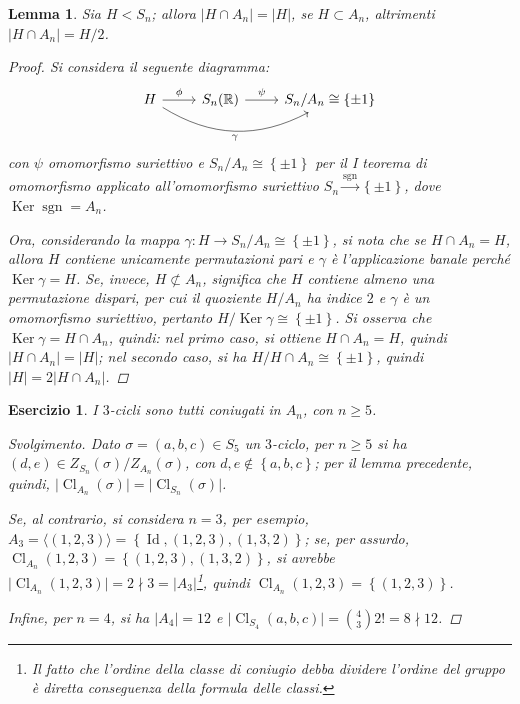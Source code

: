 \documentclass[11pt]{scrartcl}
\theoremstyle{style1}
\newtheorem{lemma}{Lemma}[teorema]
\newtheorem{esercizio}{Esercizio}[section]
\newenvironment{svolgimento}{\renewcommand\qedsymbol{$\blacksquare$}\begin{proof}[Svolgimento]}{\end{proof}}
\numberwithin{equation}{subsection}
\begin{document}
\begin{lemma}
	Sia $H < S_n$; allora $ \lvert H \cap  A_n \rvert = |H|$, se $H \subset A_n$, altrimenti $\lvert H \cap A_n \rvert = H / 2$.
	\begin{proof}
		Si considera il seguente diagramma:
	\[
\begin{tikzcd}
H \arrow[r, "\phi "] 
    \arrow[rr, bend right=30, "{\gamma}"'] & 
S_n(\mathbb{R}) \arrow[r, "\psi  "] & S_n / A_n \cong \left\{ \pm 1 \right\} 
\end{tikzcd}
\]
con $\psi  $ omomorfismo suriettivo e $S_n / A_n \cong \left\{ \pm 1 \right\} $ per il I teorema di omomorfismo applicato all'omomorfismo suriettivo $S_n \stackrel{\operatorname{sgn} }{\longrightarrow} \left\{ \pm 1 \right\} $, dove $\operatorname{Ker} \operatorname{sgn}  = A_n$. 

Ora, considerando la mappa $\gamma : H \to S_n / A_n \cong \left\{ \pm 1 \right\} $, si nota che se $H\cap A_n = H$, allora $H$ contiene unicamente permutazioni pari e $\gamma$ \`e l'applicazione banale perch\'e $\operatorname{Ker} \gamma = H$.
Se, invece, $H \not\subset A_n$, significa che $H$ contiene almeno una permutazione dispari, per cui il quoziente $H / A_n$ ha indice $2$ e $\gamma$ \`e un omomorfismo suriettivo, pertanto $H / \operatorname{Ker} \gamma \cong \left\{ \pm 1 \right\} $.
Si osserva che $\operatorname{Ker} \gamma = H \cap A_n$, quindi: nel primo caso, si ottiene $H\cap A_n= H$, quindi $\lvert H\cap A_n \rvert = \lvert H \rvert $; nel secondo caso, si ha $H / H\cap A_n \cong \left\{ \pm 1 \right\} $, quindi $\lvert H \rvert = 2 \lvert H \cap A_n \rvert $.
	\end{proof}
\end{lemma}
\begin{esercizio}
I $3$-cicli sono tutti coniugati in $A_n$, con $n\ge 5$.
\begin{svolgimento}
	Dato $\sigma =(a,b,c) \in S_5$ un $3$-ciclo, per $n\ge 5$ si ha $(d,e) \in Z_{S_n} (\sigma ) / Z_{A_n} (\sigma )$, con $d,e \not \in \left\{ a,b,c \right\} $; per il lemma precedente, quindi, $\lvert \operatorname{Cl} _{A_n} (\sigma ) \rvert = \lvert \operatorname{Cl} _{S_n} (\sigma  )\rvert $.

	Se, al contrario, si considera $n=3$, per esempio, $A_3 = \langle (1,2,3) \rangle=\left\{ \operatorname{Id} , (1,2,3), (1,3,2) \right\} $; se, per assurdo, $\operatorname{Cl} _{A_n} (1,2,3) = \left\{ (1,2,3),(1,3,2) \right\} $, si avrebbe $\lvert \operatorname{Cl} _{A_n} (1,2,3) \rvert = 2 \nmid 3 = \lvert A_3 \rvert $\footnote{Il fatto che l'ordine della classe di coniugio debba dividere l'ordine del gruppo \`e diretta conseguenza della formula delle classi.}, quindi $\operatorname{Cl} _{A_n} (1,2,3) = \left\{ (1,2,3) \right\} $.

	Infine, per $n=4$, si ha $\lvert A_4 \rvert =12$ e $\lvert \operatorname{Cl} _{S_4} (a,b,c) \rvert = \binom{4}{3}2! = 8  \nmid  12$.
\end{svolgimento}
\end{esercizio}
\end{document}
